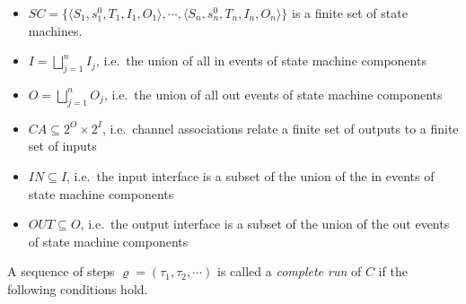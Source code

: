 \documentclass[conference]{IEEEtran}
\begin{document}
\begin{itemize}
	\item $\mathit{SC} = \{\langle S_1, s_1^0, T_1, I_1, O_1\rangle, \cdots, \langle S_n, s_n^0, T_n, I_n, O_n\rangle\}$ is a finite set of state machines.
	
	\item $I = \bigsqcup_{j = 1}^{n}I_j$, i.e.~the union of all in events of state machine components
	
	\item $O = \bigsqcup_{j = 1}^{n}O_j$, i.e.~the union of all out events of state machine components
	
	\item $\mathit{CA} \subseteq 2^O \times 2^I$, i.e.~channel associations relate a finite set of outputs to a finite set of inputs
	
	\item $\mathit{IN} \subseteq I $, i.e.~the input interface is a subset of the union of the in events of state machine components
	
	\item $\mathit{OUT} \subseteq O $, i.e.~the output interface is a subset of the union of the out events of state machine components
\end{itemize}
A sequence of steps $\varrho = (\tau_1, \tau_2, \cdots)$ is called a \emph{complete run} of $C$ if the following conditions hold.
\end{document}
